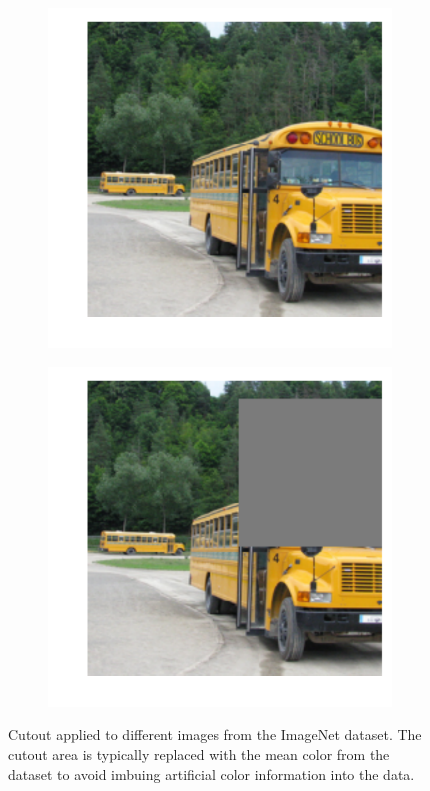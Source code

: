 \begin{figure}[ht!]
\begin{subfigure}{.4\textwidth}
		\includegraphics[width=.75\textwidth]{data/cutout_off-1419}
	\end{subfigure}
	\begin{subfigure}{.4\textwidth}
		\centering
		\includegraphics[width=.75\textwidth]{data/cutout_on-1419}
	\end{subfigure}
\caption[Cutout applied to different ImageNet images]{Cutout applied to different images from the ImageNet dataset. The cutout area is typically replaced with the
mean color from the dataset to avoid imbuing artificial color information into the data.}
\label{fig:cutout}
\end{figure}

